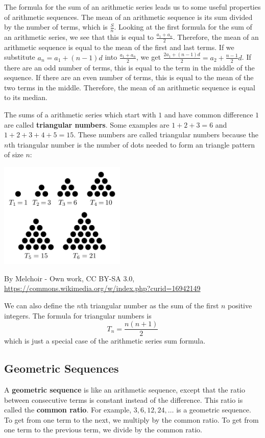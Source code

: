 \documentclass{article}
\begin{document}
\begin{multicols}{2}
        The formula for the sum of an arithmetic series leads us to some useful
        properties of arithmetic sequences.  The mean of an arithmetic sequence
        is its sum divided by the number of terms, which is $\frac{S}{n}$.
        Looking at the first formula for the sum of an arithmetic series, we see
        that this is equal to $\frac{a_1 + a_n}{2}$. Therefore, the mean of an
        arithmetic sequence is equal to the mean of the first and last terms. If
        we substitute $a_n = a_1 + (n - 1)d$ into $\frac{a_1 + a_n}{2}$, we get
        $\frac{2a_1 + (n - 1)d}{2} = a_2 + \frac{n - 1}{2}d$. If there are an
        odd number of terms, this is equal to the term in the middle of the
        sequence. If there are an even number of terms, this is equal to the
        mean of the two terms in the middle. Therefore, the mean of an
        arithmetic sequence is equal to its median.

        The sums of a arithmetic series which start with $1$ and have common
        difference $1$ are called \textbf{triangular numbers}. Some examples are
        $1 + 2 + 3 = 6$ and $1 + 2 + 3 + 4 + 5 = 15$. These numbers are called
        triangular numbers because the $n$th triangular number is the number of
        dots needed to form an triangle pattern of size $n$:
        \begin{center}
            \includegraphics[width=6cm]{triangular_numbers}

            By Melchoir - Own work, CC BY-SA 3.0,
            \url{https://commons.wikimedia.org/w/index.php?curid=16942149}
        \end{center}
        We can also define the $n$th triangular number as the sum of the first
        $n$ positive integers. The formula for triangular numbers is
        \[T_n = \frac{n(n + 1)}{2}\] which is just a special case of the
        arithmetic series sum formula.

        \subsection*{Geometric Sequences}
        A \textbf{geometric sequence} is like an arithmetic sequence, except
        that the ratio between consecutive terms is constant instead of the
        difference. This ratio is called the \textbf{common ratio}. For example,
        $3, 6, 12, 24, \dots$ is a geometric sequence. To get from one term to
        the next, we multiply by the common ratio. To get from one term to the
        previous term, we divide by the common ratio.


\end{multicols}
\end{document}
